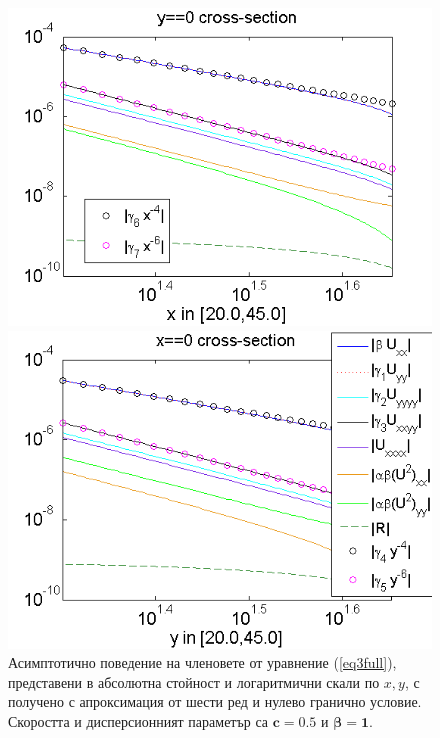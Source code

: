 \documentclass[a4paper]{article}
\newcommand{\rf}[1]{(\ref{#1})}
\theoremstyle{remark}
\begin{document}
\begin{large}
\begin{figure}[ht]
	\begin{minipage}[b]{0.95\linewidth}
		\raggedleft
		\includegraphics[width=\linewidth]{AssymptForEachTerm/bt1_c010_090/ChristovIC_AlongX_50_ZB2_bt1_c050_h020_O(h^6).png}
	\end{minipage}
	\begin{minipage}[b]{0.95\linewidth}
		 \raggedright
		\includegraphics[width=\linewidth]{AssymptForEachTerm/bt1_c010_090/ChristovIC_AlongY_50_ZB2_bt1_c050_h020_O(h^6).png}
	\end{minipage}
	\caption{Асимптотично поведение на членовете от уравнение \rf{eq3full}, представени в абсолютна стойност и логаритмични скали по $x,y$, с получено с апроксимация от шести ред и нулево гранично условие. Скоростта и дисперсионният параметър са $\boldsymbol{c=0.5}$ и $\boldsymbol{\beta = 1}$. }
	\label{fig:assympt_beta1c05}
\end{figure}
\FloatBarrier


\end{large}
\end{document}
